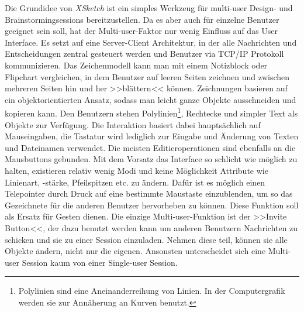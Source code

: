 \medskip Die Grundidee von \emph{XSketch} ist ein simples Werkzeug für multi-user Design- und Brainstormingsessions bereitzustellen. Da es aber auch für einzelne Benutzer geeignet sein soll, hat der Multi-user-Faktor nur wenig Einfluss auf das User Interface. Es setzt auf eine Server-Client Architektur, in der alle Nachrichten und Entscheidungen zentral gesteuert werden und Benutzer via TCP/IP Protokoll kommunizieren. Das Zeichenmodell kann man mit einem Notizblock oder Flipchart vergleichen, in dem Benutzer auf leeren Seiten zeichnen und zwischen mehreren Seiten hin und her >>blättern<< können. Zeichnungen basieren auf ein objektorientierten Ansatz, sodass man leicht ganze Objekte ausschneiden und kopieren kann. Den Benutzern stehen Polylinien\footnote{Polylinien sind eine Aneinanderreihung von Linien. In der Computergrafik werden sie zur Annäherung an Kurven benutzt.}, Rechtecke und simpler Text als Objekte zur Verfügung. Die Interaktion basiert dabei hauptsächlich auf Mauseingaben, die Tastatur wird lediglich zur Eingabe und Änderung von Texten und Dateinamen verwendet. Die meisten Editieroperationen sind ebenfalls an die Mausbuttons gebunden. Mit dem Vorsatz das Interface so schlicht wie möglich zu halten, existieren relativ wenig Modi und keine Möglichkeit Attribute wie Linienart, -stärke, Pfeilspitzen etc. zu ändern. Dafür ist es möglich einen Telepointer durch Druck auf eine bestimmte Maustaste einzublenden, um so das Gezeichnete für die anderen Benutzer hervorheben zu können. Diese Funktion soll als Ersatz für Gesten dienen.
Die einzige Multi-user-Funktion ist der >>Invite Button<<, der dazu benutzt werden kann um anderen Benutzern Nachrichten zu schicken und sie zu einer Session einzuladen. Nehmen diese teil, können sie alle Objekte ändern, nicht nur die eigenen. Ansonsten unterscheidet sich eine Multi-user Session kaum von einer Single-user Session.

